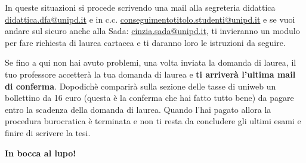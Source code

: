\documentclass[12pt]{article}
\begin{document}
In queste situazioni si procede scrivendo una mail alla segreteria didattica \href{mailto:didattica.dfa@unipd.it}{didattica.dfa@unipd.it} e in c.c. \href{mailto:conseguimentotitolo.studenti@unipd.it}{conseguimentotitolo.studenti@unipd.it} e se vuoi andare sul sicuro anche alla Sada: \href{mailto:cinzia.sada@unipd.it}{cinzia.sada@unipd.it}, ti invieranno un modulo per fare richiesta di laurea cartacea e ti daranno loro le istruzioni da seguire.

\vspace{2cm}
Se fino a qui non hai avuto problemi, una volta inviata la domanda di laurea, il tuo professore accetterà la tua domanda di laurea e \textbf{ti arriverà l'ultima mail di conferma}. Dopodichè comparirà sulla sezione delle tasse di uniweb un bollettino da 16 euro (questa è la conferma che hai fatto tutto bene) da pagare entro la scadenza della domanda di laurea. Quando l'hai pagato allora la procedura burocratica è terminata e non ti resta da concludere gli ultimi esami e finire di scrivere la tesi. 

\bigskip
\hspace{\fill}\textbf{In bocca al lupo!}\hspace{\fill}
\end{document}
